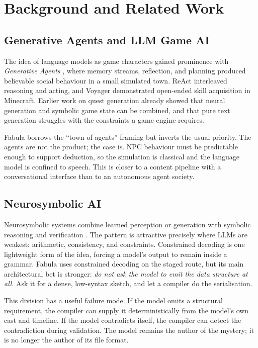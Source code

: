 ﻿\documentclass[11pt,a4paper]{report}
\begin{document}
\chapter{Background and Related Work}
\label{ch:related}

\section{Generative Agents and LLM Game AI}
The idea of language models as game characters gained prominence with \emph{Generative Agents} \cite{park2023generative}, where memory streams, reflection, and planning produced believable social behaviour in a small simulated town. ReAct \cite{yao2023react} interleaved reasoning and acting, and Voyager \cite{wang2023voyager} demonstrated open-ended skill acquisition in Minecraft. Earlier work on quest generation \cite{ammanabrolu2020quest} already showed that neural generation and symbolic game state can be combined, and that pure text generation struggles with the constraints a game engine requires.

Fabula borrows the ``town of agents'' framing but inverts the usual priority. The agents are not the product; the case is. NPC behaviour must be predictable enough to support deduction, so the simulation is classical and the language model is confined to speech. This is closer to a content pipeline with a conversational interface than to an autonomous agent society.

\section{Neurosymbolic AI}
Neurosymbolic systems combine learned perception or generation with symbolic reasoning and verification \cite{garcez2023neurosymbolic,kautz2022third}. The pattern is attractive precisely where LLMs are weakest: arithmetic, consistency, and constraints. Constrained decoding \cite{willard2023guided} is one lightweight form of the idea, forcing a model's output to remain inside a grammar. Fabula uses constrained decoding on the staged route, but its main architectural bet is stronger: \emph{do not ask the model to emit the data structure at all}. Ask it for a dense, low-syntax sketch, and let a compiler do the serialisation.

This division has a useful failure mode. If the model omits a structural requirement, the compiler can supply it deterministically from the model's own cast and timeline. If the model contradicts itself, the compiler can detect the contradiction during validation. The model remains the author of the mystery; it is no longer the author of its file format.
\end{document}
